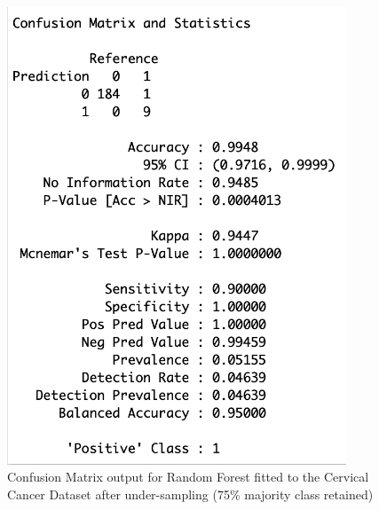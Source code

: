 \begin{figure}[!htbp]
    \centering
    \begin{minipage}{0.45\textwidth}
        \centering
        \includegraphics[width=0.9\textwidth]{ThesisTemplate/appendix/images/Chapter5Appendix/ConfusionMatrix75/CervicalCancer.png}
        \caption{Confusion Matrix output for Random Forest fitted to the Cervical Cancer Dataset after under-sampling (75\% majority class retained)}
        \label{fig:my_label}
    \end{minipage}\hfill
    \begin{minipage}{0.45\textwidth}
        \centering

\end{minipage}
\end{figure}
